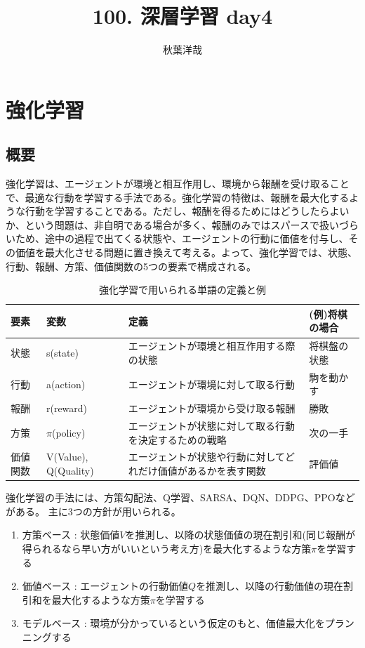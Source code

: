 \documentclass{ltjsarticle}
\begin{document}
\title{100. 深層学習 day4}
\author{秋葉洋哉}
\maketitle

\section{強化学習}
\subsection{概要}

強化学習は、エージェントが環境と相互作用し、環境から報酬を受け取ることで、最適な行動を学習する手法である。強化学習の特徴は、報酬を最大化するような行動を学習することである。ただし、報酬を得るためにはどうしたらよいか、という問題は、非自明である場合が多く、報酬のみではスパースで扱いづらいため、途中の過程で出てくる状態や、エージェントの行動に価値を付与し、その価値を最大化させる問題に置き換えて考える。よって、強化学習では、状態、行動、報酬、方策、価値関数の5つの要素で構成される。
\begin{table}[ht]
  \centering
  \begin{tabularx}{\textwidth}{|X|X|X|X|}
  \hline
  要素 & 変数 & 定義 & (例)将棋の場合 \\ \hline \hline
  状態 & s(state) & エージェントが環境と相互作用する際の状態 & 将棋盤の状態 \\ \hline
  行動 & a(action) & エージェントが環境に対して取る行動 & 駒を動かす \\ \hline
  報酬 & r(reward) & エージェントが環境から受け取る報酬 & 勝敗 \\ \hline
  方策 & $\pi$(policy) & エージェントが状態に対して取る行動を決定するための戦略 & 次の一手 \\ \hline
  価値関数 & V(Value), Q(Quality) & エージェントが状態や行動に対してどれだけ価値があるかを表す関数 & 評価値 \\ \hline
  \end{tabularx}
  \caption{強化学習で用いられる単語の定義と例}
  \label{tab:reinforcement_learning}
\end{table}
\par
強化学習の手法には、方策勾配法、Q学習、SARSA、DQN、DDPG、PPOなどがある。
主に3つの方針が用いられる。
\begin{enumerate}
  \item 方策ベース : 状態価値$V$を推測し、以降の状態価値の現在割引和(同じ報酬が得られるなら早い方がいいという考え方)を最大化するような方策$\pi$を学習する
  \item 価値ベース : エージェントの行動価値$Q$を推測し、以降の行動価値の現在割引和を最大化するような方策$\pi$を学習する
  \item モデルベース : 環境が分かっているという仮定のもと、価値最大化をプランニングする
\end{enumerate}
\end{document}
